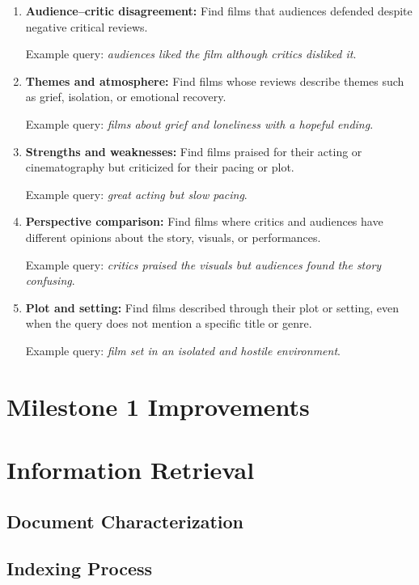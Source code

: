 \begin{enumerate}[leftmargin=*]
  \item \textbf{Audience--critic disagreement:} Find films that audiences defended despite negative critical reviews.

    Example query: \emph{audiences liked the film although critics disliked it}.

  \item \textbf{Themes and atmosphere:} Find films whose reviews describe themes such as grief, isolation, or emotional recovery.

    Example query: \emph{films about grief and loneliness with a hopeful ending}.

  \item \textbf{Strengths and weaknesses:} Find films praised for their acting or cinematography but criticized for their pacing or plot.

    Example query: \emph{great acting but slow pacing}.

  \item \textbf{Perspective comparison:} Find films where critics and audiences have different opinions about the story, visuals, or performances.

    Example query: \emph{critics praised the visuals but audiences found the story confusing}.

  \item \textbf{Plot and setting:} Find films described through their plot or setting, even when the query does not mention a specific title or genre.

    Example query: \emph{film set in an isolated and hostile environment}.
\end{enumerate}

\section{Milestone 1 Improvements}

\section{Information Retrieval}

\subsection{Document Characterization}

\subsection{Indexing Process}

